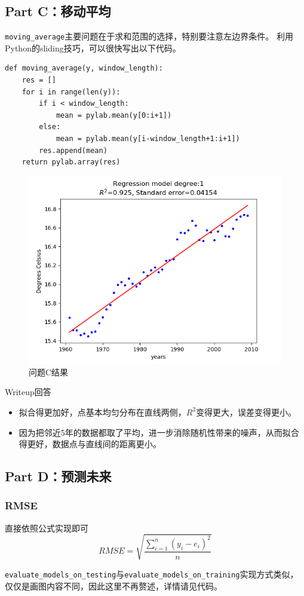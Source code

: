 \documentclass[logo,reportComp]{thesis}
\begin{document}
\subsection*{Part C：移动平均}
\verb'moving_average'主要问题在于求和范围的选择，特别要注意左边界条件。
利用Python的sliding技巧，可以很快写出以下代码。
\begin{lstlisting}
def moving_average(y, window_length):
    res = []
    for i in range(len(y)):
        if i < window_length:
            mean = pylab.mean(y[0:i+1])
        else:
            mean = pylab.mean(y[i-window_length+1:i+1])
        res.append(mean)
    return pylab.array(res)
\end{lstlisting}

\begin{figure}[H]
\centering
\includegraphics[width=0.6\linewidth]{fig/C.png}
\caption{问题C结果}
\end{figure}

Writeup回答
\begin{itemize}
	\item 拟合得更加好，点基本均匀分布在直线两侧，$R^2$变得更大，误差变得更小。
	\item 因为把邻近5年的数据都取了平均，进一步消除随机性带来的噪声，从而拟合得更好，数据点与直线间的距离更小。
\end{itemize}

\subsection*{Part D：预测未来}
\subsubsection{RMSE}
直接依照公式实现即可
\[RMSE=\sqrt{\frac{\sum_{i=1}^n(y_i-e_i)^2}{n}}\]

\verb'evaluate_models_on_testing'与\verb'evaluate_models_on_training'实现方式类似，仅仅是画图内容不同，因此这里不再赘述，详情请见代码。
\end{document}
